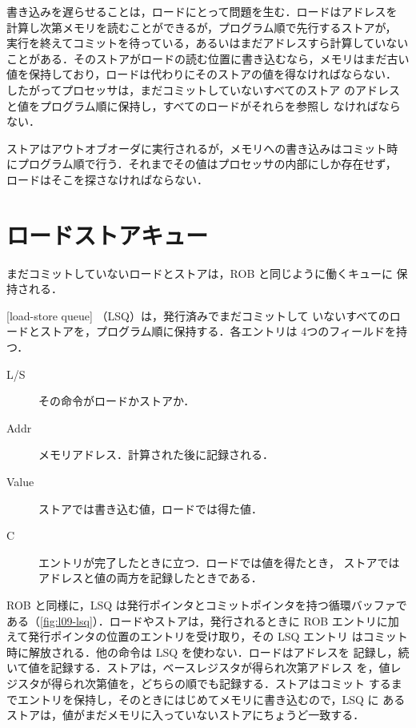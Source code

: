 \documentclass[../main.tex]{subfiles}
\begin{document}
書き込みを遅らせることは，ロードにとって問題を生む．ロードはアドレスを
計算し次第メモリを読むことができるが，プログラム順で先行するストアが，
実行を終えてコミットを待っている，あるいはまだアドレスすら計算していない
ことがある．そのストアがロードの読む位置に書き込むなら，メモリはまだ古い
値を保持しており，ロードは代わりにそのストアの値を得なければならない．
したがってプロセッサは，まだコミットしていないすべてのストア
のアドレスと値をプログラム順に保持し，すべてのロードがそれらを参照し
なければならない．

\begin{keypoint}
  ストアはアウトオブオーダに実行されるが，メモリへの書き込みはコミット時
  にプログラム順で行う．それまでその値はプロセッサの内部にしか存在せず，
  ロードはそこを探さなければならない．
\end{keypoint}

\section{ロードストアキュー}
\label{sec:l09-lsq}

まだコミットしていないロードとストアは，ROB と同じように働くキューに
保持される．

\begin{definition}[ロードストアキュー]
  \label{def:l09-lsq}
  [load-store queue]%
  （LSQ）は，発行済みでまだコミットして
  いないすべてのロードとストアを，プログラム順に保持する．各エントリは
  4つのフィールドを持つ．
  \begin{description}
    \item[L/S] その命令がロードかストアか．
    \item[Addr] メモリアドレス．計算された後に記録される．
    \item[Value] ストアでは書き込む値，ロードでは得た値．
    \item[C] エントリが完了したときに立つ．ロードでは値を得たとき，
      ストアではアドレスと値の両方を記録したときである．
  \end{description}
\end{definition}

ROB と同様に，LSQ は発行ポインタとコミットポインタを持つ循環バッファで
ある（\cref{fig:l09-lsq}）．ロードやストアは，発行されるときに ROB
エントリに加えて発行ポインタの位置のエントリを受け取り，その LSQ エントリ
はコミット時に解放される．他の命令は LSQ を使わない．ロードはアドレスを
記録し，続いて値を記録する．ストアは，ベースレジスタが得られ次第アドレス
を，値レジスタが得られ次第値を，どちらの順でも記録する．ストアはコミット
するまでエントリを保持し，そのときにはじめてメモリに書き込むので，LSQ に
あるストアは，値がまだメモリに入っていないストアにちょうど一致する．
\end{document}
